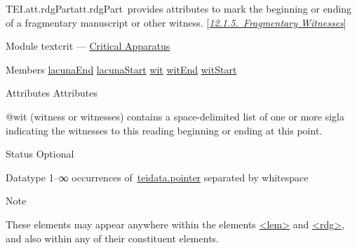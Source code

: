 \begin{reflist}
\item[]\begin{specHead}{TEI.att.rdgPart}{att.rdgPart} provides attributes to mark the beginning or ending of a fragmentary manuscript or other witness. [\textit{\hyperref[TCAPMI]{12.1.5.\ Fragmentary Witnesses}}]\end{specHead} 
    \item[{Module}]
  textcrit — \hyperref[TC]{Critical Apparatus}
    \item[{Members}]
  \hyperref[TEI.lacunaEnd]{lacunaEnd} \hyperref[TEI.lacunaStart]{lacunaStart} \hyperref[TEI.wit]{wit} \hyperref[TEI.witEnd]{witEnd} \hyperref[TEI.witStart]{witStart}
    \item[{Attributes}]
  Attributes\hfil\\[-10pt]\begin{sansreflist}
    \item[@wit]
  (witness or witnesses) contains a space-delimited list of one or more sigla indicating the witnesses to this reading beginning or ending at this point.
\begin{reflist}
    \item[{Status}]
  Optional
    \item[{Datatype}]
  1–∞ occurrences of \hyperref[TEI.teidata.pointer]{teidata.pointer} separated by whitespace
\end{reflist}  
\end{sansreflist}  
    \item[{Note}]
  \par
These elements may appear anywhere within the elements \hyperref[TEI.lem]{<lem>} and \hyperref[TEI.rdg]{<rdg>}, and also within any of their constituent elements.
\end{reflist}  
